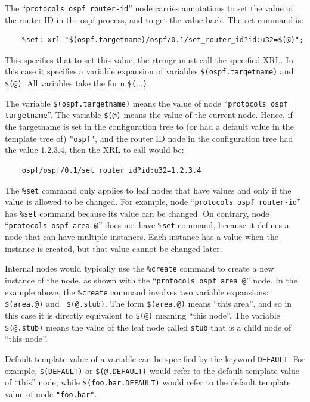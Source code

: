 \documentclass[11pt]{article}
\begin{document}
The ``{\tt protocols ospf router-id}'' node carries annotations to set
the value of the router ID in the ospf process, and to get the value
back.  The set command is:

\begin{verbatim}
    %set: xrl "$(ospf.targetname)/ospf/0.1/set_router_id?id:u32=$(@)";
\end{verbatim}

This specifies that to set this value, the rtrmgr must call the
specified XRL.  In this case it specifies a variable expansion of
variables {\tt \$(ospf.targetname)} and  {\tt \$(@)}.  All variables take the
form {\tt \$(}...{\tt )}.

The variable {\tt \$(ospf.targetname)} means the value of node
``{\tt protocols ospf targetname}''.
The variable {\tt \$(@)} means the value of the current node.
Hence, if the targetname is set in the configuration tree to (or had a default
value in the template tree of) {\tt "ospf"}, and the router ID node in the
configuration tree had the value 1.2.3.4, then the XRL to call would be:

\begin{verbatim}
    ospf/ospf/0.1/set_router_id?id:u32=1.2.3.4
\end{verbatim}

The {\tt \%set} command only applies to leaf nodes that have values and only
if the value is allowed to be changed.
For example, node ``{\tt protocols ospf router-id}'' has {\tt \%set} command
because its value can be changed.
On contrary, node ``{\tt protocols ospf area @}'' does not have
{\tt \%set} command, because it defines a node that can have multiple
instances. Each instance has a value when the instance is created, but that
value cannot be changed later.

Internal nodes would typically use the {\tt \%create} command to
create a new instance of the node, as shown with the ``{\tt protocols ospf
area @}'' node.  In the example above, the {\tt \%create} command
involves two variable expansions: {\tt \$(area.@)} and {\tt
\$(@.stub)}.  The form {\tt \$(area.@)} means ``this area'', and so
in this case it is directly equivalent to {\tt \$(@)} meaning ``this node''.
The variable {\tt \$(@.stub)} means the value of the leaf node called
{\tt stub} that is a child node of ``this node''.

Default template value of a variable can be specified by the keyword
{\tt DEFAULT}. For example, {\tt \$(DEFAULT)} or {\tt \$(@.DEFAULT)}
would refer to the default template value of ``this'' node, while
{\tt \$(foo.bar.DEFAULT)} would refer to the default template value
of node {\tt "foo.bar"}.
\end{document}
